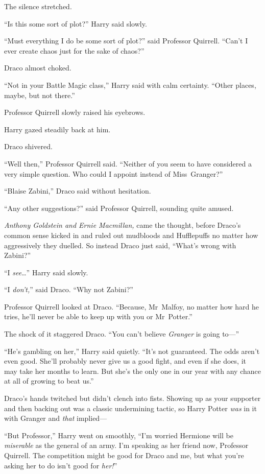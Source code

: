 The silence stretched.

“Is this some sort of plot?” Harry said slowly.

“Must everything I do be some sort of plot?” said Professor Quirrell. “Can’t I ever create chaos just for the sake of chaos?”

Draco almost choked.

“Not in your Battle Magic class,” Harry said with calm certainty. “Other places, maybe, but not there.”

Professor Quirrell slowly raised his eyebrows.

Harry gazed steadily back at him.

Draco shivered.

“Well then,” Professor Quirrell said. “Neither of you seem to have considered a very simple question. Who could I appoint instead of Miss~Granger?”

“Blaise Zabini,” Draco said without hesitation.

“Any other suggestions?” said Professor Quirrell, sounding quite amused.

\emph{Anthony Goldstein and Ernie Macmillan,} came the thought, before Draco’s common sense kicked in and ruled out mudbloods and Hufflepuffs no matter how aggressively they duelled. So instead Draco just said, “What’s wrong with Zabini?”

“I \emph{see}…” Harry said slowly.

“I \emph{don’t,}” said Draco. “Why not Zabini?”

Professor Quirrell looked at Draco. “Because, Mr~Malfoy, no matter how hard he tries, he’ll never be able to keep up with you or Mr~Potter.”

The shock of it staggered Draco. “You can’t believe \emph{Granger} is going to—”

“He’s gambling on her,” Harry said quietly. “It’s not guaranteed. The odds aren’t even good. She’ll probably never give us a good fight, and even if she does, it may take her months to learn. But she’s the only one in our year with any chance at all of growing to beat us.”

Draco’s hands twitched but didn’t clench into fists. Showing up as your supporter and then backing out was a classic undermining tactic, so Harry Potter \emph{was} in it with Granger and \emph{that} implied—

“But Professor,” Harry went on smoothly, “I’m worried Hermione will be \emph{miserable} as the general of an army. I’m speaking as her friend now, Professor Quirrell. The competition might be good for Draco and me, but what you’re asking her to do isn’t good for \emph{her!}”

